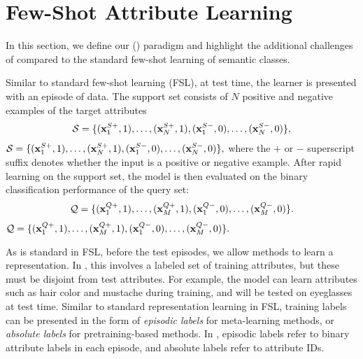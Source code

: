 
\savespacebeforesection
\section{Few-Shot Attribute Learning}
\savespacebeforesection

In this section, we define our \titlelower{} (\taskname{}) paradigm and
highlight the additional challenges of \taskname{} compared to the standard
few-shot learning of semantic classes.

Similar to standard few-shot learning (FSL), at test time, the learner is presented
with an episode of data. The support set consists of $N$ positive and negative
examples of the target attributes
\ifarxiv
\begin{align}
{\mathcal{S}} = \{ ({\mathbf{x}}^{S+}_1, 1), \dots, ({\mathbf{x}}^{S+}_N, 1), ({\mathbf{x}}^{S-}_1, 0), \dots,
({\mathbf{x}}^{S-}_N, 0) \},
\end{align}
\else
${\mathcal{S}} = \{ ({\mathbf{x}}^{S+}_1, 1), \dots, ({\mathbf{x}}^{S+}_N, 1), ({\mathbf{x}}^{S-}_1, 0), \dots,
({\mathbf{x}}^{S-}_N, 0) \},$
\fi
where the  $+$ or $-$ superscript suffix denotes whether the input is a
positive or negative example. 
After rapid learning on the support set, the
model is then evaluated on the binary classification performance of the query
set:
\ifarxiv
\begin{align}
{\mathcal{Q}} = \{ ({\mathbf{x}}^{Q+}_1, 1), \dots, ({\mathbf{x}}^{Q+}_M, 1), ({\mathbf{x}}^{Q-}_1, 0), \dots,
({\mathbf{x}}^{Q-}_M, 0) \}.
\end{align}
\else
${\mathcal{Q}} = \{ ({\mathbf{x}}^{Q+}_1, 1), \dots, ({\mathbf{x}}^{Q+}_M, 1), ({\mathbf{x}}^{Q-}_1, 0), \dots,
({\mathbf{x}}^{Q-}_M, 0) \}.$
\fi

As is standard in FSL, before the test episodes, 
we allow methods to learn a representation.
In \taskname, this involves a labeled set of training attributes, but these must be disjoint from test attributes. For example, the model can learn attributes such as hair color and mustache during training, and will be tested on eyeglasses at test time.
Similar to standard representation learning in FSL,
training labels can be presented in the form of \textit{episodic labels} for meta-learning methods, or \textit{absolute labels} for pretraining-based methods. In \taskname{}, episodic labels refer to binary attribute labels in each episode, and absolute labels refer to attribute IDs. 


